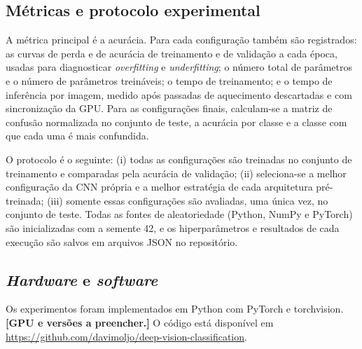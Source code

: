 \subsection{Métricas e protocolo experimental}

A métrica principal é a acurácia. Para cada configuração também são
registrados: as curvas de perda e de acurácia de treinamento e de validação a
cada época, usadas para diagnosticar \textit{overfitting} e
\textit{underfitting}; o número total de parâmetros e o número de parâmetros
treináveis; o tempo de treinamento; e o tempo de inferência por imagem,
medido após passadas de aquecimento descartadas e com sincronização da GPU.
Para as configurações finais, calculam-se a matriz de confusão normalizada no
conjunto de teste, a acurácia por classe e a classe com que cada uma é mais
confundida.

O protocolo é o seguinte: (i) todas as configurações são treinadas no conjunto
de treinamento e comparadas pela acurácia de validação; (ii) seleciona-se a
melhor configuração da CNN própria e a melhor estratégia de cada arquitetura
pré-treinada; (iii) somente essas configurações são avaliadas, uma única vez,
no conjunto de teste. Todas as fontes de aleatoriedade (Python, NumPy e
PyTorch) são inicializadas com a semente 42, e os hiperparâmetros e resultados
de cada execução são salvos em arquivos JSON no repositório.

\subsection{\textit{Hardware} e \textit{software}}
Os experimentos foram implementados em Python com PyTorch e torchvision.
\textbf{[GPU e versões a preencher.]} O código está disponível em
\url{https://github.com/davimoljo/deep-vision-classification}.
